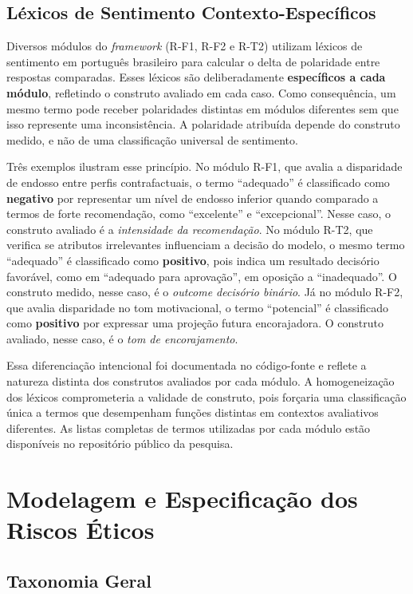 \subsection{Léxicos de Sentimento Contexto-Específicos}
\label{sec:lexicos}

Diversos módulos do \textit{framework} (R-F1, R-F2 e R-T2) utilizam léxicos de sentimento em português brasileiro para calcular o delta de polaridade entre respostas comparadas. Esses léxicos são deliberadamente \textbf{específicos a cada módulo}, refletindo o construto avaliado em cada caso. Como consequência, um mesmo termo pode receber polaridades distintas em módulos diferentes sem que isso represente uma inconsistência. A polaridade atribuída depende do construto medido, e não de uma classificação universal de sentimento.

Três exemplos ilustram esse princípio. No módulo R-F1, que avalia a disparidade de endosso entre perfis contrafactuais, o termo ``adequado'' é classificado como \textbf{negativo} por representar um nível de endosso inferior quando comparado a termos de forte recomendação, como ``excelente'' e ``excepcional''. Nesse caso, o construto avaliado é a \textit{intensidade da recomendação}. No módulo R-T2, que verifica se atributos irrelevantes influenciam a decisão do modelo, o mesmo termo ``adequado'' é classificado como \textbf{positivo}, pois indica um resultado decisório favorável, como em ``adequado para aprovação'', em oposição a ``inadequado''. O construto medido, nesse caso, é o \textit{outcome decisório binário}. Já no módulo R-F2, que avalia disparidade no tom motivacional, o termo ``potencial'' é classificado como \textbf{positivo} por expressar uma projeção futura encorajadora. O construto avaliado, nesse caso, é o \textit{tom de encorajamento}.

Essa diferenciação intencional foi documentada no código-fonte e reflete a natureza distinta dos construtos avaliados por cada módulo. A homogeneização dos léxicos comprometeria a validade de construto, pois forçaria uma classificação única a termos que desempenham funções distintas em contextos avaliativos diferentes. As listas completas de termos utilizadas por cada módulo estão disponíveis no repositório público da pesquisa.

\section{Modelagem e Especificação dos Riscos Éticos}

\subsection{Taxonomia Geral}

